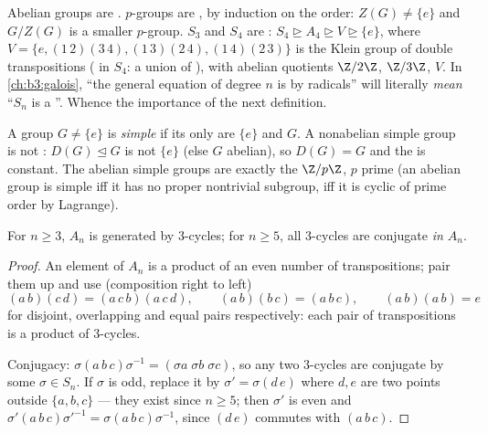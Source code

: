 \begin{example}\label{ex:b3:groups:solvableexamples}
Abelian groups are . $p$-groups are , by induction
on the order: $Z(G) \neq \{e\}$ and $G/Z(G)$ is a smaller
$p$-group. $S_3$ and $S_4$ are : $S_4 \trianglerighteq A_4
\trianglerighteq V \trianglerighteq \{e\}$, where $V = \{e,
(1\,2)(3\,4), (1\,3)(2\,4), (1\,4)(2\,3)\}$ is the Klein group of
double transpositions ( in $S_4$: a union of ), with abelian quotients $\Z/2\Z$, $\Z/3\Z$, $V$. In
\cref{ch:b3:galois}, ``the general equation of degree $n$ is
 by radicals'' will literally \emph{mean} ``$S_n$ is a
''. Whence the importance of the next definition.
\end{example}

\begin{definition}\label{def:b3:groups:simple}
A group $G \neq \{e\}$ is \emph{simple} if its
only  are $\{e\}$ and $G$. A nonabelian simple
group is not : $D(G) \trianglelefteq G$ is not $\{e\}$
(else $G$ abelian), so $D(G) = G$ and the  is
constant. The abelian simple groups are exactly the $\Z/p\Z$, $p$
prime (an abelian group is simple iff it has no proper nontrivial
subgroup, iff it is cyclic of prime order by Lagrange).
\end{definition}

\begin{lemma}\label{lem:b3:groups:threecycles}
For $n \geq 3$, $A_n$ is generated by $3$-cycles; for $n \geq 5$,
all $3$-cycles are conjugate \emph{in $A_n$}.
\end{lemma}

\begin{proof}
An element of $A_n$ is a product of an even number of
transpositions; pair them up and use (composition right to left)
\[
(a\,b)(c\,d) = (a\,c\,b)(a\,c\,d), \qquad
(a\,b)(b\,c) = (a\,b\,c), \qquad
(a\,b)(a\,b) = e
\]
for disjoint, overlapping and equal pairs respectively: each pair
of transpositions is a product of $3$-cycles.

Conjugacy: $\sigma(a\,b\,c)\sigma^{-1} = (\sigma a\; \sigma b\;
\sigma c)$, so any two $3$-cycles are conjugate by some $\sigma \in
S_n$. If $\sigma$ is odd, replace it by $\sigma' = \sigma (d\,e)$
where $d, e$ are two points outside $\{a, b, c\}$ --- they exist
since $n \geq 5$; then $\sigma'$ is even and $\sigma'(a\,b\,c)
\sigma'^{-1} = \sigma(a\,b\,c)\sigma^{-1}$, since $(d\,e)$ commutes
with $(a\,b\,c)$.
\end{proof}

